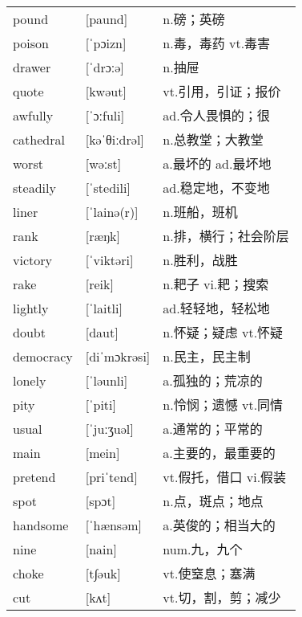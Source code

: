 \documentclass[a4paper]{article}
\begin{document}
\section{}
\begin{tabular}{l l l}

pound & [paund] & n.磅；英磅 \\
poison & [ˈpɔizn] & n.毒，毒药 vt.毒害 \\
drawer & [ˈdrɔːə] & n.抽屉 \\
quote & [kwəut] & vt.引用，引证；报价 \\
awfully & [ˈɔːfuli] & ad.令人畏惧的；很 \\
cathedral & [kəˈθiːdrəl] & n.总教堂；大教堂 \\
worst & [wəːst] & a.最坏的 ad.最坏地 \\
steadily & [ˈstedili] & ad.稳定地，不变地 \\
liner & [ˈlainə(r)] & n.班船，班机 \\
rank & [ræŋk] & n.排，横行；社会阶层 \\
victory & [ˈviktəri] & n.胜利，战胜 \\
rake & [reik] & n.耙子 vi.耙；搜索 \\
lightly & [ˈlaitli] & ad.轻轻地，轻松地 \\
doubt & [daut] & n.怀疑；疑虑 vt.怀疑 \\
democracy & [diˈmɔkrəsi] & n.民主，民主制 \\
lonely & [ˈləunli] & a.孤独的；荒凉的 \\
pity & [ˈpiti] & n.怜悯；遗憾 vt.同情 \\
usual & [ˈjuːʒuəl] & a.通常的；平常的 \\
main & [mein] & a.主要的，最重要的 \\
pretend & [priˈtend] & vt.假托，借口 vi.假装 \\
spot & [spɔt] & n.点，斑点；地点 \\
handsome & [ˈhænsəm] & a.英俊的；相当大的 \\
nine & [nain] & num.九，九个 \\
choke & [t∫əuk] & vt.使窒息；塞满 \\
cut & [kʌt] & vt.切，割，剪；减少 \\

\end{tabular}
\end{document}
